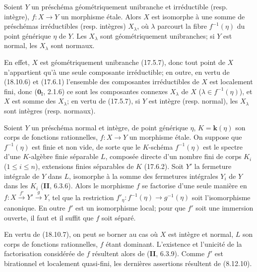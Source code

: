 \begin{proposition}[18.10.7]
\label{IV.18.10.7}
Soient $Y$ un préschéma géométriquement unibranche et irréductible \textup{(resp.} intègre\textup{)}, $f:X\to Y$ un morphisme étale. Alors $X$ est isomorphe à une somme de préschémas irréductibles \textup{(resp.} intègres\textup{)} $X_\lambda$, où $\lambda$ parcourt la fibre $f^{-1}(\eta)$ du point générique $\eta$ de $Y$. Les $X_\lambda$ sont géométriquement unibranches; si $Y$ est normal, les $X_\lambda$ sont normaux.
\end{proposition}

En effet, $X$ est géométriquement unibranche (17.5.7), donc tout point de $X$ n'appartient qu'à une seule composante irréductible; en outre, en vertu de (18.10.6) et (17.6.1) l'ensemble des composantes irréductibles de $X$ est localement fini, donc ($\mathbf{0}_{\mathrm I}$, 2.1.6) ce sont les composantes connexes $X_\lambda$ de $X$ ($\lambda\in f^{-1}(\eta)$), et $X$ est somme des $X_\lambda$; en vertu de (17.5.7), si $Y$ est intègre (resp. normal), les $X_\lambda$ sont intègres (resp. normaux).

\begin{proposition}[18.10.8]
\label{IV.18.10.8}
Soient $Y$ un préschéma normal et intègre, de point générique $\eta$, $K=\boldsymbol{k}(\eta)$ son corps de fonctions rationnelles, $f:X\to Y$ un morphisme étale. On suppose que $f^{-1}(\eta)$ est finie et non vide, de sorte que le $K$-schéma $f^{-1}(\eta)$ est le spectre d'une $K$-algèbre finie séparable $L$, composée directe d'un nombre fini de corps $K_i$ \textup{($1\leq i\leq n$)}, extensions finies séparables de $K$ \textup{(17.6.2)}. Soit $Y'$ la fermeture intégrale de $Y$ dans $L$, isomorphe à la somme des fermetures intégrales $Y_i$ de $Y$ dans les $K_i$ \textup{(\textbf{II}, 6.3.6)}. Alors le morphisme $f$ se factorise d'une seule manière en $f:X\xrightarrow{f'}Y'\xrightarrow{g}Y$, tel que la restriction $f'_\eta:f^{-1}(\eta)\to g^{-1}(\eta)$ soit l'isomorphisme canonique. En outre $f'$ est un isomorphisme local; pour que $f'$ soit une immersion ouverte, il faut et il suffit que $f$ soit séparé.
\end{proposition}

En vertu de (18.10.7), on peut se borner au cas où $X$ est intègre et normal, $L$ son corps de fonctions rationnelles, $f$ étant dominant. L'existence et l'unicité de la factorisation considérée de $f$ résultent alors de (\textbf{II}, 6.3.9). Comme $f'$ est birationnel et localement quasi-fini, les dernières assertions résultent de (8.12.10).

